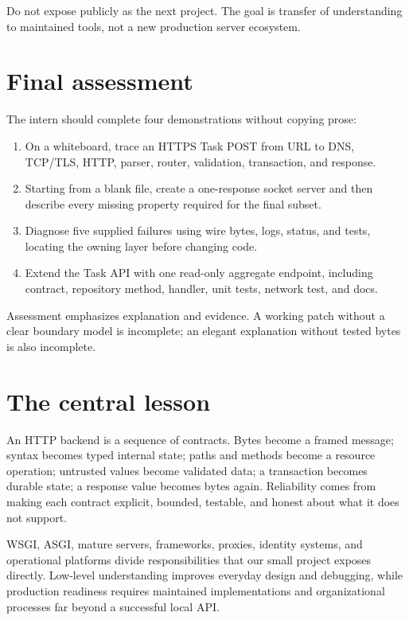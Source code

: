 Do not expose  publicly as the next project. The goal is transfer
of understanding to maintained tools, not a new production server ecosystem.

\section{Final assessment}

The intern should complete four demonstrations without copying prose:

\begin{enumerate}
  \item On a whiteboard, trace an HTTPS Task POST from URL to DNS, TCP/TLS, HTTP,
        parser, router, validation, transaction, and response.
  \item Starting from a blank file, create a one-response socket server and then
        describe every missing property required for the final subset.
  \item Diagnose five supplied failures using wire bytes, logs, status, and tests,
        locating the owning layer before changing code.
  \item Extend the Task API with one read-only aggregate endpoint, including
        contract, repository method, handler, unit tests, network test, and docs.
\end{enumerate}

Assessment emphasizes explanation and evidence. A working patch without a clear
boundary model is incomplete; an elegant explanation without tested bytes is
also incomplete.

\section{The central lesson}

An HTTP backend is a sequence of contracts. Bytes become a framed message;
syntax becomes typed internal state; paths and methods become a resource
operation; untrusted values become validated data; a transaction becomes durable
state; a response value becomes bytes again. Reliability comes from making each
contract explicit, bounded, testable, and honest about what it does not support.

\summarytitle

WSGI, ASGI, mature servers, frameworks, proxies, identity systems, and operational
platforms divide responsibilities that our small project exposes directly.
Low-level understanding improves everyday design and debugging, while production
readiness requires maintained implementations and organizational processes far
beyond a successful local API.

